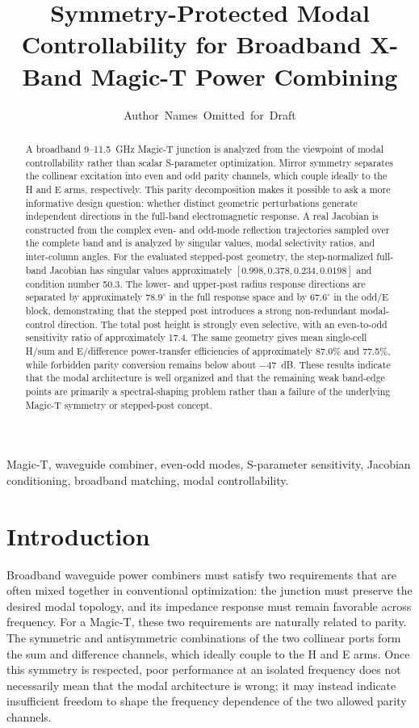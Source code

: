 \documentclass[journal]{IEEEtran}
\title{Symmetry-Protected Modal Controllability for Broadband X-Band Magic-T Power Combining}
\author{Author~Names~Omitted~for~Draft}
\begin{document}
\maketitle

\begin{abstract}
A broadband 9--11.5~GHz Magic-T junction is analyzed from the viewpoint of modal controllability rather than scalar S-parameter optimization.
Mirror symmetry separates the collinear excitation into even and odd parity channels, which couple ideally to the H and E arms, respectively.
This parity decomposition makes it possible to ask a more informative design question: whether distinct geometric perturbations generate independent directions in the full-band electromagnetic response.
A real Jacobian is constructed from the complex even- and odd-mode reflection trajectories sampled over the complete band and is analyzed by singular values, modal selectivity ratios, and inter-column angles.
For the evaluated stepped-post geometry, the step-normalized full-band Jacobian has singular values approximately $[0.998,0.378,0.234,0.0198]$ and condition number 50.3.
The lower- and upper-post radius response directions are separated by approximately $78.9^\circ$ in the full response space and by $67.6^\circ$ in the odd/E block, demonstrating that the stepped post introduces a strong non-redundant modal-control direction.
The total post height is strongly even selective, with an even-to-odd sensitivity ratio of approximately 17.4.
The same geometry gives mean single-cell H/sum and E/difference power-transfer efficiencies of approximately 87.0\% and 77.5\%, while forbidden parity conversion remains below about $-47$~dB.
These results indicate that the modal architecture is well organized and that the remaining weak band-edge points are primarily a spectral-shaping problem rather than a failure of the underlying Magic-T symmetry or stepped-post concept.
\end{abstract}

\begin{IEEEkeywords}
Magic-T, waveguide combiner, even-odd modes, S-parameter sensitivity, Jacobian conditioning, broadband matching, modal controllability.
\end{IEEEkeywords}

\section{Introduction}
Broadband waveguide power combiners must satisfy two requirements that are often mixed together in conventional optimization: the junction must preserve the desired modal topology, and its impedance response must remain favorable across frequency.
For a Magic-T, these two requirements are naturally related to parity.
The symmetric and antisymmetric combinations of the two collinear ports form the sum and difference channels, which ideally couple to the H and E arms.
Once this symmetry is respected, poor performance at an isolated frequency does not necessarily mean that the modal architecture is wrong; it may instead indicate insufficient freedom to shape the frequency dependence of the two allowed parity channels.
\end{document}
